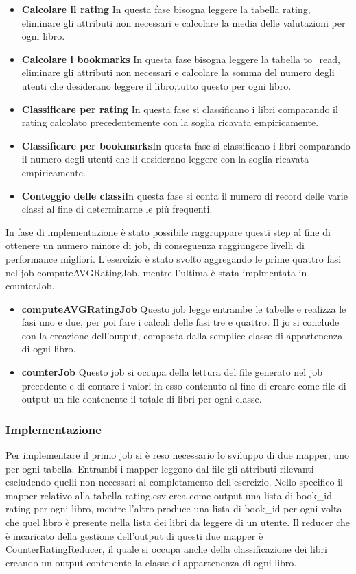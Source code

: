 \begin{itemize}
    \item \textbf{Calcolare il rating} In questa fase bisogna leggere la tabella rating, eliminare gli attributi non necessari
    e calcolare la media delle valutazioni per ogni libro.
    \item \textbf{Calcolare i bookmarks} In questa fase bisogna leggere la tabella to_read, eliminare gli attributi non necessari
    e calcolare la somma del numero degli utenti che desiderano leggere il libro,tutto questo per ogni libro.
    \item \textbf{Classificare per rating} In questa fase si classificano i libri comparando il rating calcolato
    precedentemente con la soglia ricavata empiricamente.
    \item \textbf{Classificare per bookmarks}In questa fase si classificano i libri comparando il numero degli utenti che li desiderano leggere
    con la soglia ricavata empiricamente.
     \item \textbf{Conteggio delle classi}In questa fase si conta il numero di record delle varie classi al fine di determinarne le più
     frequenti.
\end{itemize}

In fase di implementazione è stato possibile raggruppare questi step al fine di ottenere un numero minore di job, di conseguenza raggiungere
livelli di performance migliori.
L'esercizio è stato svolto aggregando le prime quattro fasi nel job computeAVGRatingJob,
mentre l'ultima è stata implmentata in counterJob.

\begin{itemize}
    \item \textbf{computeAVGRatingJob} Questo job legge entrambe le tabelle e realizza le fasi uno e due, per poi fare i calcoli delle fasi tre e quattro.
    Il jo si conclude con la creazione dell'output, composta dalla semplice classe di appartenenza di ogni libro.
    \item \textbf{counterJob} Questo job si occupa della lettura del file generato nel job precedente e di contare i valori in esso contenuto al
    fine di creare come file di output un file contenente il totale di libri per ogni classe.
\end{itemize}

\subsubsection{Implementazione}
Per implementare il primo job si è reso necessario lo sviluppo di due mapper, uno per ogni tabella.
Entrambi i mapper leggono dal file gli attributi rilevanti escludendo quelli non necessari al completamento dell'esercizio.
Nello specifico il mapper relativo alla tabella rating.csv crea come output una lista di book_id - rating per ogni libro, mentre l'altro
produce una lista di book_id per ogni volta che quel libro è presente nella lista dei libri da leggere di un utente.
Il reducer che è incaricato della gestione dell'output di questi due mapper è CounterRatingReducer, il quale si occupa anche della classificazione dei
libri creando un output contenente la classe di appartenenza di ogni libro.

